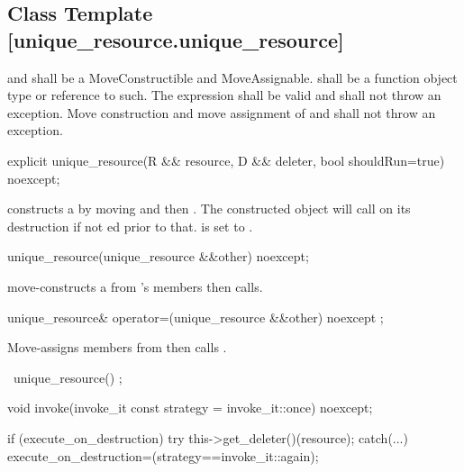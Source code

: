 \documentclass[ebook,11pt,article]{memoir}
\begin{document}
\subsection {Class Template  [unique_resource.unique_resource]}

\pnum
\requires  {} and  shall be a MoveConstructible and MoveAssignable.
 shall be a function object type or reference to such. 
The expression  shall be valid
and shall not throw an exception.  %
Move construction and move assignment of  and  shall not throw an exception.


\begin{itemdecl}
explicit
unique_resource(R && resource, D && deleter, bool shouldRun=true) noexcept;
\end{itemdecl}

\pnum
\effects constructs a  by moving  and then . The constructed object will call  on its destruction if not ed prior to that.  is set to .

\begin{itemdecl}
unique_resource(unique_resource &&other) noexcept;
\end{itemdecl}

\pnum
\effects move-constructs a  from 's members then calls.

\begin{itemdecl}
unique_resource& operator=(unique_resource  &&other) noexcept ;
\end{itemdecl}

\pnum
\effects {} Move-assigns members from  then calls .

\begin{itemdecl}
~unique_resource() ;
\end{itemdecl}

\pnum
\effects {}

\begin{itemdecl}
void invoke(invoke_it const strategy = invoke_it::once) noexcept;
\end{itemdecl}

\pnum
\effects 
\begin{codeblock}
if (execute_on_destruction) try {
	this->get_deleter()(resource);
} catch(...){}
execute_on_destruction=(strategy==invoke_it::again);
\end{codeblock}
\end{document}
